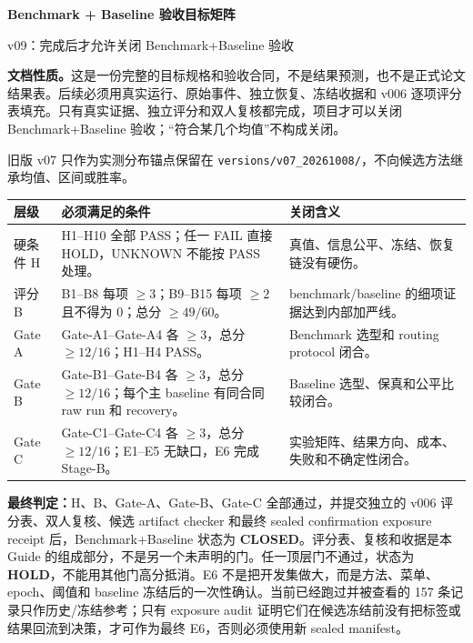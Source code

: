 \documentclass[10pt,letterpaper]{article}
\newcommand{\B}[1]{{\color{GuideBlue}#1}}
\newcommand{\sect}[1]{\vspace{4pt}{\large\bfseries\color{GuideBlue}#1}\par\vspace{2pt}}
\newenvironment{clean}{\begin{center}\fontsize{8.55}{10.05}\selectfont\setlength{\tabcolsep}{3.7pt}\renewcommand{\arraystretch}{1.04}}{\end{center}}
\begin{document}
{\LARGE\bfseries Benchmark + Baseline 验收目标矩阵}\par
{\large v09：完成后才允许关闭 Benchmark+Baseline 验收}\par
\vspace{3pt}
\textbf{文档性质。}这是一份\B{完整的目标规格和验收合同}，不是结果预测，也不是正式论文结果表。后续必须用真实运行、原始事件、独立恢复、冻结收据和 v006 逐项评分表填充。只有真实证据、独立评分和双人复核都完成，项目才可以关闭 Benchmark+Baseline 验收；“符合某几个均值”不构成关闭。\par 旧版 v07 只作为实测分布锚点保留在 \texttt{versions/v07\_20261008/}，不向候选方法继承均值、区间或胜率。

\sect{1. 关闭条件：先过硬门，再过三门}
\begin{clean}
\begin{tabular}{@{}p{.14\linewidth}p{.48\linewidth}p{.25\linewidth}@{}}
\toprule
层级 & 必须满足的条件 & 关闭含义\\
\midrule
硬条件 H & H1--H10 全部 PASS；任一 FAIL 直接 HOLD，UNKNOWN 不能按 PASS 处理。 & 真值、信息公平、冻结、恢复链没有硬伤。\\
评分 B & B1--B8 每项 $\ge3$；B9--B15 每项 $\ge2$ 且不得为 0；总分 $\ge49/60$。 & benchmark/baseline 的细项证据达到内部加严线。\\
Gate A & Gate-A1--Gate-A4 各 $\ge3$，总分 $\ge12/16$；H1--H4 PASS。 & Benchmark 选型和 routing protocol 闭合。\\
Gate B & Gate-B1--Gate-B4 各 $\ge3$，总分 $\ge12/16$；每个主 baseline 有同合同 raw run 和 recovery。 & Baseline 选型、保真和公平比较闭合。\\
Gate C & Gate-C1--Gate-C4 各 $\ge3$，总分 $\ge12/16$；E1--E5 无缺口，E6 完成 Stage-B。 & 实验矩阵、结果方向、成本、失败和不确定性闭合。\\
\bottomrule
\end{tabular}
\end{clean}
\textbf{最终判定：}H、B、Gate-A、Gate-B、Gate-C 全部通过，并提交独立的 v006 评分表、双人复核、候选 artifact checker 和最终 sealed confirmation exposure receipt 后，Benchmark+Baseline 状态为 \textbf{CLOSED}。评分表、复核和收据是本 Guide 的组成部分，不是另一个未声明的门。任一顶层门不通过，状态为 \textbf{HOLD}，不能用其他门高分抵消。E6 不是把开发集做大，而是方法、菜单、epoch、阈值和 baseline 冻结后的一次性确认。当前已经跑过并被查看的 157 条记录只作历史/冻结参考；只有 exposure audit 证明它们在候选冻结前没有把标签或结果回流到决策，才可作为最终 E6，否则必须使用新 sealed manifest。
\end{document}
